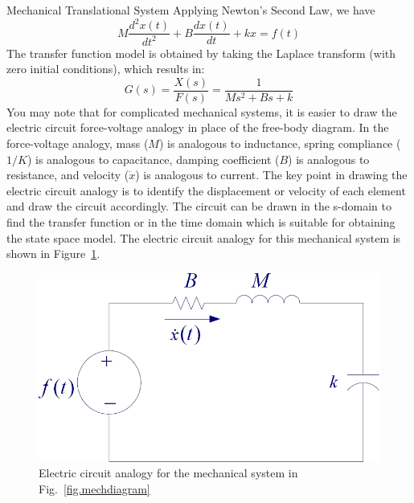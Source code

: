 \begin{casestudy}{Mechanical Translational System}
Applying Newton's Second Law, we have 
\begin{equation}
    M\frac{d^2 x(t)}{dt^2} + B\frac{d x(t)}{dt} + kx = f(t)
        \label{eq.mechfreebody}
\end{equation}
The transfer function model is obtained by taking the Laplace transform (with zero initial conditions), which results in:
\begin{equation}
    G(s) = \frac{X(s)}{F(s)} = \frac{1}{Ms^2 + Bs + k}
        \label{eq.mechtf}
\end{equation}
You may note that for complicated mechanical systems, it is easier to draw the electric circuit force-voltage analogy in place of the free-body diagram.  In the force-voltage analogy, mass ($M$) is analogous to inductance, spring compliance ($1/K$) is analogous to capacitance, damping coefficient ($B$) is analogous to resistance, and velocity ($\dot{x}$) is analogous to current.  The key point in drawing the electric circuit analogy is to identify the displacement or velocity of each element and draw the circuit accordingly.  The circuit can be drawn in the s-domain to find the transfer function or in the time domain which is suitable for obtaining the state space model.  The electric circuit analogy for this mechanical system is shown in Figure~\ref{fig.mechelecanalogy}.

\begin{figure}[bht]
\centering
\includegraphics[width=.5\textwidth]{mechelecanalogy}
\caption{\footnotesize
        Electric circuit analogy for the mechanical system in Fig.\ \ref{fig.mechdiagram}
        \label{fig.mechelecanalogy}
        }
\end{figure}


\end{casestudy}
